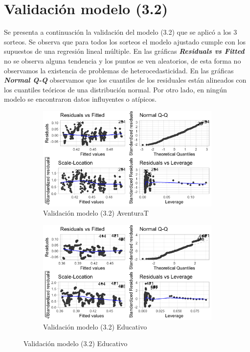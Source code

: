 \chapter{Validación modelo (3.2)}

Se presenta a continuación la validación del modelo (3.2) que se aplicó a los 3 sorteos. Se observa que para todos los sorteos el modelo ajustado cumple con los supuestos de una regresión lineal múltiple. En las gráficas \textbf{\textit{Residuals vs Fitted}} no se observa alguna tendencia y los puntos se ven aleatorios, de esta forma no observamos la existencia de problemas de heterocedasticidad. En las gráficas \textbf{\textit{Normal Q-Q}} observamos que los cuantiles de los residuales están alineados con los cuantiles teóricos de una distribución normal. Por otro lado, en ningún modelo se encontraron datos influyentes o atípicos.

\begin{figure}[H]
\centering
\label{fig:Validacion_mod2}
\begin{subfigure}
  \centering
  \caption{Validación modelo (3.2) AventuraT}
  \includegraphics[width=.85\linewidth]{Imagenes/cuadritco_aven.png}
\end{subfigure}%
\begin{subfigure}
  \centering
  \caption{Validación modelo (3.2) Educativo}
  \includegraphics[width=.85\linewidth]{Imagenes/cuadratico_educ.png}
\end{subfigure}
\end{figure}

